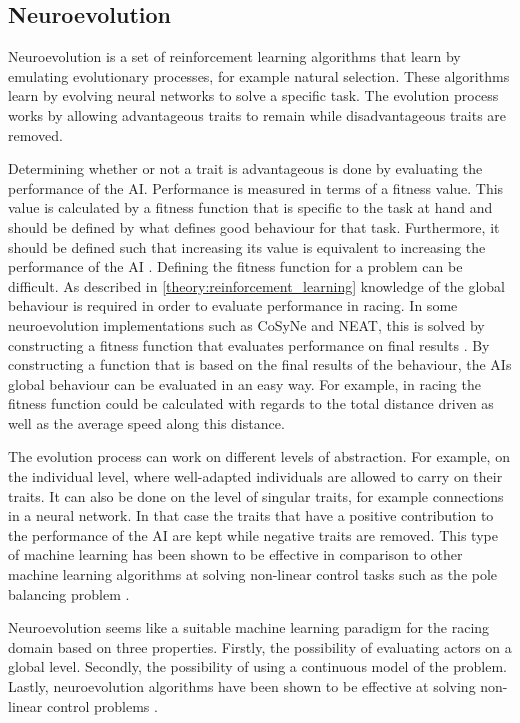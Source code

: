 \subsection{Neuroevolution}
\label{section:neuroevolution}
Neuroevolution is a set of reinforcement learning algorithms that learn by emulating evolutionary processes, for example natural selection. These algorithms learn by evolving neural networks to solve a specific task. The evolution process works by allowing advantageous traits to remain while disadvantageous traits are removed.  

Determining whether or not a trait is advantageous is done by evaluating the performance of the AI. Performance is measured in terms of a fitness value. This value is calculated by a fitness function that is specific to the task at hand and should be defined by what defines good behaviour for that task. Furthermore, it should be defined such that increasing its value is equivalent to increasing the performance of the AI \cite{nelson}. Defining the fitness function for a problem can be difficult. As described in \ref{theory:reinforcement_learning} knowledge of the global behaviour is required in order to evaluate performance in racing. In some neuroevolution implementations such as CoSyNe and NEAT, this is solved by constructing a fitness function that evaluates performance on final results \cite{gomez:CoSyNE, stanley:neat}. By constructing a function that is based on the final results of the behaviour, the AIs global behaviour can be evaluated in an easy way. For example, in racing the fitness function could be calculated with regards to the total distance driven as well as the average speed along this distance.

The evolution process can work on different levels of abstraction. For example, on the individual level, where well-adapted individuals are allowed to carry on their traits. It can also be done on the level of singular traits, for example connections in a neural network. In that case the traits that have a positive contribution to the performance of the AI are kept while negative traits are removed. This type of machine learning has been shown to be effective in comparison to other machine learning algorithms at solving non-linear control tasks such as the pole balancing problem \cite{gomez:efficient_nonlinear_control}.

Neuroevolution seems like a suitable machine learning paradigm for the racing domain based on three properties. Firstly, the possibility of evaluating actors on a global level. Secondly, the possibility of using a continuous model of the problem. Lastly, neuroevolution algorithms have been shown to be effective at solving non-linear control problems \cite{gomez:efficient_nonlinear_control}. 


